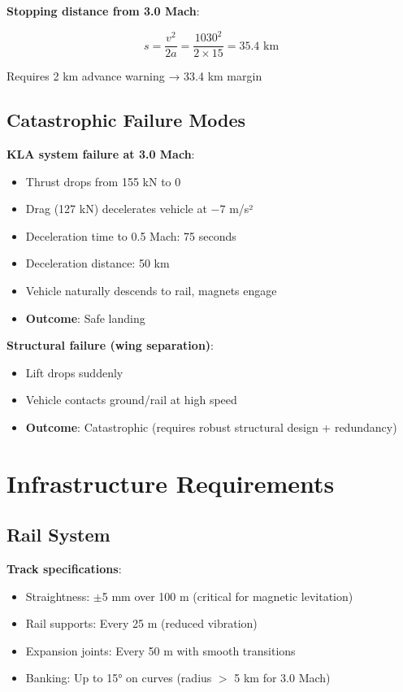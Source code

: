 \documentclass[12pt,a4paper]{article}
\begin{document}
\textbf{Stopping distance from 3.0 Mach}:

\begin{equation}
s = \frac{v^2}{2a} = \frac{1030^2}{2 \times 15} = 35.4 \text{ km}
\end{equation}

Requires 2 km advance warning → 33.4 km margin

\subsection{Catastrophic Failure Modes}

\textbf{KLA system failure at 3.0 Mach}:
\begin{itemize}
\item Thrust drops from 155 kN to 0
\item Drag (127 kN) decelerates vehicle at $-7$ m/s²
\item Deceleration time to 0.5 Mach: 75 seconds
\item Deceleration distance: 50 km
\item Vehicle naturally descends to rail, magnets engage
\item \textbf{Outcome}: Safe landing
\end{itemize}

\textbf{Structural failure (wing separation)}:
\begin{itemize}
\item Lift drops suddenly
\item Vehicle contacts ground/rail at high speed
\item \textbf{Outcome}: Catastrophic (requires robust structural design + redundancy)
\end{itemize}

\section{Infrastructure Requirements}

\subsection{Rail System}

\textbf{Track specifications}:
\begin{itemize}
\item Straightness: $\pm$5 mm over 100 m (critical for magnetic levitation)
\item Rail supports: Every 25 m (reduced vibration)
\item Expansion joints: Every 50 m with smooth transitions
\item Banking: Up to 15° on curves (radius $>$ 5 km for 3.0 Mach)
\end{itemize}
\end{document}

